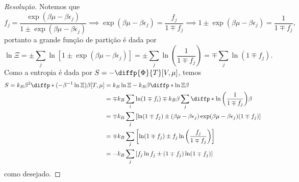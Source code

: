 \begin{proof}[Resolução]
    Notemos que
    \begin{equation*}
        f_j = \frac{\exp(\beta \mu - \beta \epsilon_j)}{1 \pm \exp(\beta \mu - \beta \epsilon_j)} \implies \exp(\beta \mu - \beta \epsilon_j) = \frac{f_j}{1 \mp f_j} \implies 1 \pm \exp(\beta \mu - \beta \epsilon_j) = \frac{1}{1 \mp f_j},
    \end{equation*}
    portanto a grande função de partição é dada por
    \begin{equation*}
        \ln{\Xi} = \pm \sum_j \ln[1 \pm \exp(\beta \mu - \beta \epsilon_j)] = \pm \sum_j \ln\left(\frac{1}{1 \mp f_j}\right) = \mp \sum_j \ln(1 \mp f_j).
    \end{equation*}
    Como a entropia é dada por \(S = -\diffp{\Phi}{T}[V,\mu]\), temos
    \begin{align*}
        S = k_B \beta^2 \diffp*{(-\beta^{-1} \ln\Xi)}{\beta}[T,\mu]
          &= k_B \ln\Xi - k_B \beta \diffp*{\ln{\Xi}}{\beta} \\
          &= \mp k_B  \sum_i \ln(1 \mp f_i) \mp k_B \beta \sum_{j}\diffp*{\ln\left(\frac{1}{1 \mp f_j}\right)}{\beta}\\
          &= \mp k_B \sum_j\left[ \ln(1 \mp f_j) \pm (\beta\mu - \beta \epsilon_j) \exp(\beta \mu - \beta \epsilon_j) (1 \mp f_j) \right]\\
          &= \mp k_B \sum_j\left[\ln(1\mp f_j) \pm f_j \ln\left(\frac{f_j}{1 \mp f_j}\right)\right]\\
          &= -k_B\sum_j\left[f_j \ln f_j \pm (1 \mp f_j)\ln(1 \mp f_j) \right]
    \end{align*}
    como desejado.


\end{proof}
